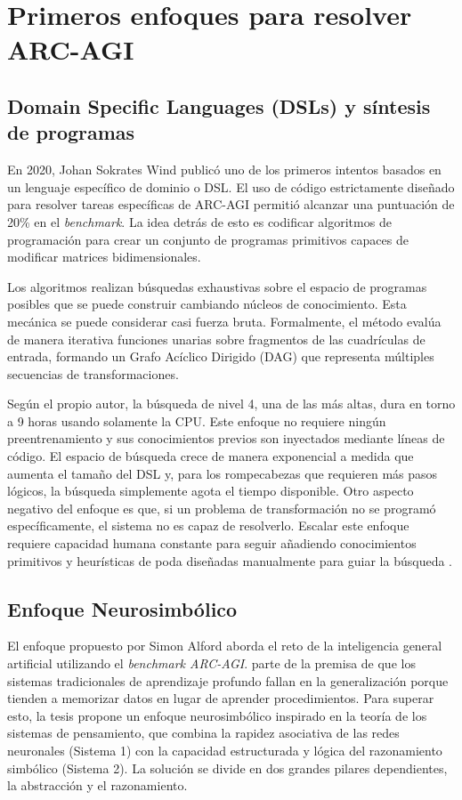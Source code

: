 \documentclass[11pt,a4paper,spanish]{book}
\numberwithin{equation}{chapter}
\numberwithin{figure}{chapter}
\begin{document}
\section{Primeros enfoques para resolver ARC-AGI}

\subsection{Domain Specific Languages (DSLs) y síntesis de programas}\label{sec:DSL}

En 2020, Johan Sokrates Wind publicó uno de los primeros intentos basados en un lenguaje específico de dominio o DSL. El uso de código estrictamente diseñado para resolver tareas específicas
de ARC-AGI permitió alcanzar una puntuación de 20\% en el \textit{benchmark}. La idea detrás de esto es codificar algoritmos de programación para crear un conjunto de programas primitivos
capaces de modificar matrices bidimensionales.

Los algoritmos realizan búsquedas exhaustivas sobre el espacio de programas posibles que se puede construir cambiando núcleos de conocimiento. Esta mecánica se puede considerar
casi fuerza bruta. Formalmente, el método evalúa de manera iterativa funciones unarias sobre fragmentos de las cuadrículas de entrada, formando un Grafo Acíclico Dirigido (DAG) que representa
múltiples secuencias de transformaciones.

Según el propio autor, la búsqueda de nivel 4, una de las más altas, dura en torno a 9 horas usando solamente la CPU. Este enfoque no requiere ningún preentrenamiento y sus conocimientos
previos son inyectados mediante líneas de código. El espacio de búsqueda crece de manera exponencial a medida que aumenta el tamaño del DSL y, para los rompecabezas que requieren
más pasos lógicos, la búsqueda simplemente agota el tiempo disponible. Otro aspecto negativo del enfoque es que, si un problema de transformación no se programó específicamente, el sistema
no es capaz de resolverlo. Escalar este enfoque requiere capacidad humana constante para seguir añadiendo conocimientos primitivos y heurísticas
de poda diseñadas manualmente para guiar la búsqueda \cite{wind2020dsl}.

\subsection{Enfoque Neurosimbólico}

El enfoque propuesto por Simon Alford \citeyear{alford2021neurosymbolic}  aborda el reto de la 
inteligencia general artificial utilizando el \textit{benchmark ARC-AGI}.  parte de la premisa de que los sistemas tradicionales de aprendizaje profundo fallan en la 
generalización porque tienden a memorizar datos en lugar de aprender procedimientos. Para superar esto, la tesis propone un enfoque 
neurosimbólico inspirado en la teoría de los sistemas de pensamiento, que combina la rapidez asociativa de las redes neuronales (Sistema 1) con la 
capacidad estructurada y lógica del razonamiento simbólico (Sistema 2). La solución se divide en dos grandes pilares dependientes, la abstracción y el razonamiento.
\end{document}
